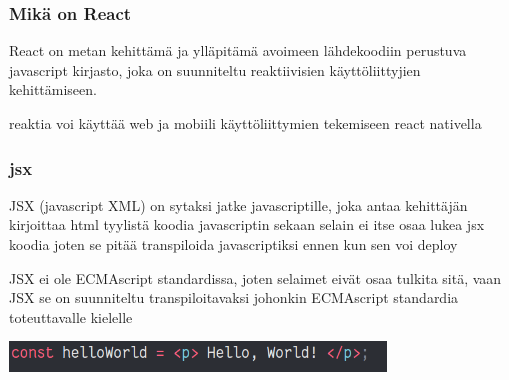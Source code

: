 

\subsubsection{Mikä on React}



React on metan kehittämä ja ylläpitämä avoimeen lähdekoodiin perustuva javascript kirjasto, joka on suunniteltu reaktiivisien käyttöliittyjien kehittämiseen.

reaktia voi käyttää web ja mobiili käyttöliittymien tekemiseen react nativella
\medskip








\subsubsection{jsx}





JSX (javascript XML) on sytaksi jatke javascriptille, joka antaa kehittäjän kirjoittaa html tyylistä koodia javascriptin sekaan
selain ei itse osaa lukea jsx koodia joten se pitää transpiloida javascriptiksi ennen kun sen voi deploy



JSX ei ole ECMAscript standardissa, joten selaimet eivät osaa tulkita sitä, vaan JSX se on suunniteltu transpiloitavaksi johonkin ECMAscript standardia toteuttavalle kielelle
\medskip

\bigskip
\includegraphics[width=10cm]{src/public/oppar/pure_jsx_example.png}

